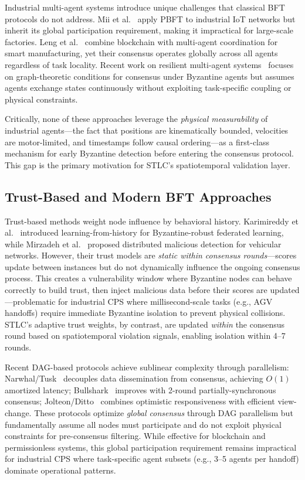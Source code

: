\documentclass[manuscript,screen,review]{acmart}
\begin{document}
Industrial multi-agent systems introduce unique challenges that classical BFT protocols do not address. Mii et al.~\cite{mivsic2020adapting} apply PBFT to industrial IoT networks but inherit its global participation requirement, making it impractical for large-scale factories. Leng et al.~\cite{leng2019manuchain} combine blockchain with multi-agent coordination for smart manufacturing, yet their consensus operates globally across all agents regardless of task locality. Recent work on resilient multi-agent systems~\cite{pirani2022survey} focuses on graph-theoretic conditions for consensus under Byzantine agents but assumes agents exchange states continuously without exploiting task-specific coupling or physical constraints.

Critically, none of these approaches leverage the \textit{physical measurability} of industrial agents---the fact that positions are kinematically bounded, velocities are motor-limited, and timestamps follow causal ordering---as a first-class mechanism for early Byzantine detection before entering the consensus protocol. This gap is the primary motivation for STLC's spatiotemporal validation layer.

\subsection{Trust-Based and Modern BFT Approaches}

Trust-based methods weight node influence by behavioral history. Karimireddy et al.~\cite{karimireddy2021learning} introduced learning-from-history for Byzantine-robust federated learning, while Mirzadeh et al.~\cite{mirzadeh2022filtering} proposed distributed malicious detection for vehicular networks. However, their trust models are \textit{static within consensus rounds}---scores update between instances but do not dynamically influence the ongoing consensus process. This creates a vulnerability window where Byzantine nodes can behave correctly to build trust, then inject malicious data before their scores are updated---problematic for industrial CPS where millisecond-scale tasks (e.g., AGV handoffs) require immediate Byzantine isolation to prevent physical collisions. STLC's adaptive trust weights, by contrast, are updated \textit{within} the consensus round based on spatiotemporal violation signals, enabling isolation within 4--7 rounds.

Recent DAG-based protocols achieve sublinear complexity through parallelism: Narwhal/Tusk~\cite{danezis2022narwhal} decouples data dissemination from consensus, achieving $O(1)$ amortized latency; Bullshark~\cite{spiegelman2022bullshark} improves with 2-round partially-synchronous consensus; Jolteon/Ditto~\cite{gelashvili2022jolteon} combines optimistic responsiveness with efficient view-change. These protocols optimize \textit{global consensus} through DAG parallelism but fundamentally assume all nodes must participate and do not exploit physical constraints for pre-consensus filtering. While effective for blockchain and permissionless systems, this global participation requirement remains impractical for industrial CPS where task-specific agent subsets (e.g., 3--5 agents per handoff) dominate operational patterns.
\end{document}
